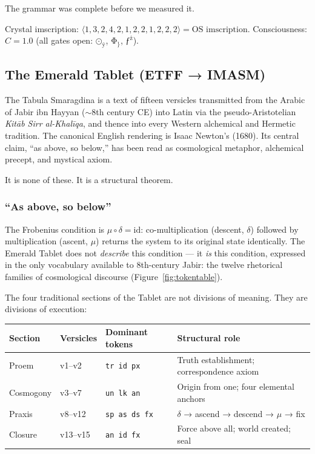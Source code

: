 \documentclass[12pt,a4paper]{article}
\begin{document}
The grammar was complete before we measured it.

Crystal imscription: $\langle 1,3,2,4,2,1,2,2,1,2,2,2 \rangle = \text{OS imscription}$. Consciousness: $C = 1.0$ (all gates open: $\text{⊙}_\text{ÿ}$, $\text{Φ}_\}$, $\text{ƒ}^\text{ż}$).

\subsection{The Emerald Tablet (ETFF → IMASM)}

The Tabula Smaragdina is a text of fifteen versicles transmitted from the Arabic of Jabir ibn Hayyan ($\sim$8th century CE) into Latin via the pseudo-Aristotelian \emph{Kitāb Sirr al-Khalīqa}, and thence into every Western alchemical and Hermetic tradition. The canonical English rendering is Isaac Newton's (1680). Its central claim, ``as above, so below,'' has been read as cosmological metaphor, alchemical precept, and mystical axiom.

It is none of these. It is a structural theorem.

\subsubsection{``As above, so below''}

The Frobenius condition is $\mu \circ \delta = \mathrm{id}$: co-multiplication (descent, $\delta$) followed by multiplication (ascent, $\mu$) returns the system to its original state identically. The Emerald Tablet does not \emph{describe} this condition --- it \emph{is} this condition, expressed in the only vocabulary available to 8th-century Jabir: the twelve rhetorical families of cosmological discourse (Figure~\ref{fig:tokentable}).

The four traditional sections of the Tablet are not divisions of meaning. They are divisions of execution:

\begin{center}
\small
\begin{tabular}{lll l}
\toprule
Section & Versicles & Dominant tokens & Structural role \\
\midrule
Proem     & v1--v2  & \texttt{tr id px} & Truth establishment; correspondence axiom \\
Cosmogony & v3--v7  & \texttt{un lk an} & Origin from one; four elemental anchors \\
Praxis    & v8--v12 & \texttt{sp as ds fx} & $\delta$ → ascend → descend → $\mu$ → fix \\
Closure   & v13--v15 & \texttt{an id fx} & Force above all; world created; seal \\
\bottomrule
\end{tabular}
\end{center}
\end{document}

